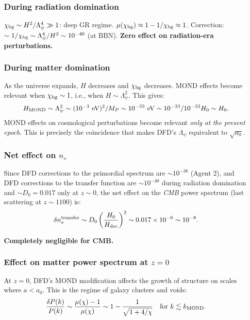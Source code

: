 \documentclass[11pt,a4paper]{article}
\begin{document}
\subsubsection{During radiation domination}

$\chi_{\rm bg} \sim H^2/\Lambda_\psi^4 \gg 1$: deep GR regime. $\mu(\chi_{\rm bg}) \approx 1 - 1/\chi_{\rm bg} \approx 1$. Correction: $\sim 1/\chi_{\rm bg} \sim \Lambda_\psi^4/H^2 \sim 10^{-40}$ (at BBN). \textbf{Zero effect on radiation-era perturbations.}

\subsubsection{During matter domination}

As the universe expands, $H$ decreases and $\chi_{\rm bg}$ decreases. MOND effects become relevant when $\chi_{\rm bg} \sim 1$, i.e., when $H \sim \Lambda_\psi^2$. This gives:
\begin{equation}
H_{\rm MOND} \sim \Lambda_\psi^2 \sim (10^{-3}\text{ eV})^2/M_P \sim 10^{-33}\text{ eV} \sim 10^{-33}/10^{-33} H_0 \sim H_0.
\end{equation}
MOND effects on cosmological perturbations become relevant \emph{only at the present epoch}. This is precisely the coincidence that makes DFD's $\Lambda_\psi$ equivalent to $\sqrt{a_0}$.

\subsubsection{Net effect on $n_s$}

Since DFD corrections to the primordial spectrum are $\sim 10^{-38}$ (Agent 2), and DFD corrections to the transfer function are $\sim 10^{-40}$ during radiation domination and $\sim D_0 = 0.017$ only at $z \sim 0$, the net effect on the \emph{CMB} power spectrum (last scattering at $z \sim 1100$) is:
\begin{equation}
\delta n_s^{\rm transfer} \sim D_0 \left(\frac{H_0}{H_{\rm dec}}\right)^2 \sim 0.017 \times 10^{-6} \sim 10^{-8}.
\end{equation}

\textbf{Completely negligible for CMB.}

\subsubsection{Effect on matter power spectrum at $z = 0$}

At $z = 0$, DFD's MOND modification affects the growth of structure on scales where $a < a_0$. This is the regime of galaxy clusters and voids:
\begin{equation}
\frac{\delta P(k)}{P(k)} \sim \frac{\mu(\chi) - 1}{\mu(\chi)} \sim 1 - \frac{1}{\sqrt{1 + 4/\chi}} \quad \text{for } k \lesssim k_{\rm MOND}.
\end{equation}
\end{document}
